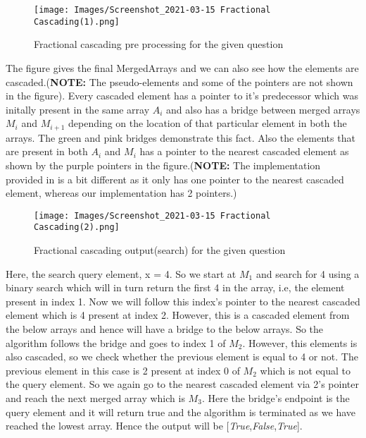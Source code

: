 \documentclass[11pt]{article}
\begin{document}
\begin{figure}[!h]
    \centering
    \texttt{[image: Images/Screenshot\_2021-03-15 Fractional Cascading(1).png]}
    \caption{Fractional cascading pre processing for the given question}
    \label{fig:label}
\end{figure}
    


The figure gives the final MergedArrays and we can also see how the elements are cascaded.(\textbf{NOTE:} The pseudo-elements and some of the pointers are not shown in the figure). Every cascaded element has a pointer to it's predecessor which was initally present in the same array $A_i$ and also has a bridge between merged arrays $M_i$ and $M_{i+1}$ depending on the location of that particular element in both the arrays. The green and pink bridges demonstrate this fact. Also the elements that are present in both $A_i$ and $M_i$ has a pointer to the nearest cascaded element as shown by the purple pointers in the figure.(\textbf{NOTE:} The implementation provided in \cite{Fractional Cascading Demo} is a bit different as it only has one pointer to the nearest cascaded element, whereas our implementation has 2 pointers.) 



\begin{figure}[H]
    \centering
    \texttt{[image: Images/Screenshot\_2021-03-15 Fractional Cascading(2).png]}
    \caption{Fractional cascading output(search) for the given question}
    \label{fig:label}
\end{figure}

Here, the search query element, x = 4. So we start at $M_1$ and search for 4 using a binary search which will in turn return the first 4 in the array, i.e, the element present in index 1. Now we will follow this index's pointer to the nearest cascaded element which is 4 present at index 2. However, this is a cascaded element from the below arrays and hence will have a bridge to the below arrays. So the algorithm follows the bridge and goes to index 1 of $M_2$. However, this elements is also cascaded, so we check whether the previous element is equal to 4 or not. The previous element in this case is 2 present at index 0 of $M_2$ which is not equal to the query element. So we again go to the nearest cascaded element via 2's pointer and reach the next merged array which is $M_3$. Here the bridge's endpoint is the query element and it will return true and the algorithm is terminated as we have reached the lowest array. Hence the output will be [\textit{True},\textit{False},\textit{True}].
\end{document}
